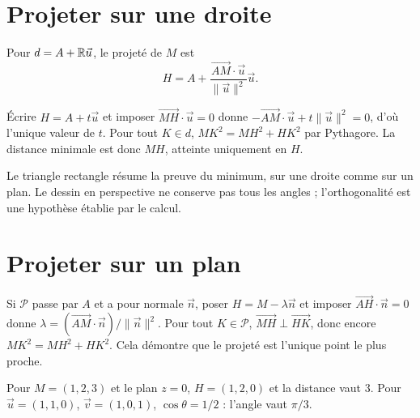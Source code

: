 \documentclass[../cours_tle.tex]{subfiles}
\begin{document}
\section{Projeter sur une droite}
Pour $d=A+\mathbb{R}\vec u$, le projeté de $M$ est
\[
H=A+\frac{\overrightarrow{AM}\cdot\vec u}{\|\vec u\|^2}\vec u.
\]
\begin{demonstration}
Écrire $H=A+t\vec u$ et imposer $\overrightarrow{MH}\cdot\vec u=0$ donne
$-\overrightarrow{AM}\cdot\vec u+t\|\vec u\|^2=0$, d'où l'unique valeur de $t$.
Pour tout $K\in d$, $MK^2=MH^2+HK^2$ par Pythagore. La distance minimale est donc $MH$, atteinte uniquement en $H$.
\end{demonstration}
\begin{center}
\end{center}
Le triangle rectangle résume la preuve du minimum, sur une droite comme sur un plan. Le dessin en perspective ne conserve pas tous les angles ; l'orthogonalité est une hypothèse établie par le calcul.
\section{Projeter sur un plan}
Si $\mathcal P$ passe par $A$ et a pour normale $\vec n$, poser
$H=M-\lambda\vec n$ et imposer $\overrightarrow{AH}\cdot\vec n=0$ donne
$\lambda=(\overrightarrow{AM}\cdot\vec n)/\|\vec n\|^2$.
Pour tout $K\in\mathcal P$, $\overrightarrow{MH}\perp\overrightarrow{HK}$, donc encore $MK^2=MH^2+HK^2$. Cela démontre que le projeté est l'unique point le plus proche.
\begin{exemple}
Pour $M=(1,2,3)$ et le plan $z=0$, $H=(1,2,0)$ et la distance vaut $3$.
Pour $\vec u=(1,1,0)$, $\vec v=(1,0,1)$, $\cos\theta=1/2$ : l'angle vaut $\pi/3$.
\end{exemple}
\end{document}
